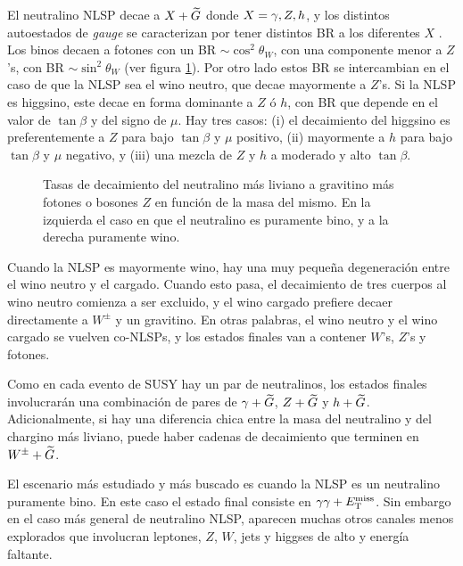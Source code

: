 El neutralino NLSP decae a $X + \widetilde{G}$ donde $X=\gamma,Z,h$, y los distintos
autoestados de \emph{gauge} se caracterizan por tener distintos BR a los diferentes $X$
\cite{Ruderman:2011vv}.
Los binos decaen a fotones con un BR $\sim \cos^2\theta_W$, con una componente
menor a $Z$'s, con BR $\sim \sin^2\theta_W$ (ver figura
\cref{fig:bino_wino_br}). Por otro lado estos BR se intercambian en el caso de
que la NLSP sea el wino neutro, que decae mayormente a $Z$'s. Si la NLSP es
higgsino, este decae en forma dominante a $Z$ ó $h$, con BR que depende en el
valor de $\tan\beta$ y del signo de $\mu$. Hay tres casos: (i) el decaimiento
del higgsino es preferentemente a $Z$ para bajo $\tan\beta$ y $\mu$ positivo,
(ii) mayormente a $h$ para bajo $\tan\beta$ y $\mu$ negativo, y (iii) una mezcla
de $Z$ y $h$ a moderado y alto $\tan\beta$.

\begin{figure}[!h]
  \centering

  
  

  \caption{Tasas de decaimiento del neutralino más liviano a gravitino más
    fotones o bosones $Z$ en función de la masa del mismo. En la izquierda el
    caso en que el neutralino es puramente bino, y a la derecha puramente wino.}
  \label{fig:bino_wino_br}
\end{figure}

Cuando la NLSP es mayormente wino, hay una muy pequeña degeneración entre el
wino neutro y el cargado. Cuando esto pasa, el decaimiento de tres cuerpos al
wino neutro comienza a ser excluido, y el wino cargado prefiere decaer
directamente a $W^{\pm}$ y un gravitino. En otras palabras, el wino neutro y el
wino cargado se vuelven co-NLSPs, y los estados finales van a contener $W$'s,
$Z$'s y fotones.

Como en cada evento de SUSY hay un par de neutralinos, los estados finales
involucrarán una combinación de pares de $\gamma + \widetilde{G}$, $Z + \widetilde{G}$ y $h
+ \widetilde{G}$. Adicionalmente, si hay una diferencia chica entre la masa del
neutralino y del chargino más liviano, puede haber cadenas de decaimiento que
terminen en $W^\pm + \widetilde{G}$.

El escenario más estudiado y más buscado es cuando la NLSP es un neutralino
puramente bino. En este caso el estado final consiste en $\gamma\gamma + E_{\mathrm{T}}^{\mathrm{miss}}$. Sin
embargo en el caso más general de neutralino NLSP, aparecen muchas otros canales
menos explorados que involucran leptones, $Z$, $W$, jets y higgses de alto {\pt}
y energía faltante.

